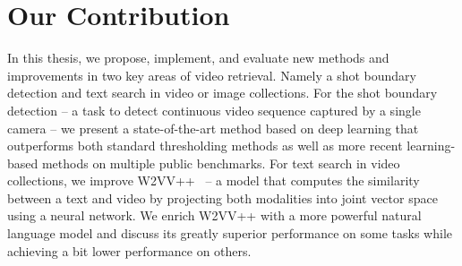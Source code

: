 


\section*{Our Contribution}
In this thesis, we propose, implement, and evaluate new methods and improvements in two key areas of video retrieval. Namely a shot boundary detection and text search in video or image collections. For the shot boundary detection -- a task to detect continuous video sequence captured by a single camera -- we present a state-of-the-art method based on deep learning that outperforms both standard thresholding methods as well as more recent learning-based methods on multiple public benchmarks. For text search in video collections, we improve W2VV++~\cite{XirongW2VVpp} -- a model that computes the similarity between a text and video by projecting both modalities into joint vector space using a neural network. We enrich W2VV++ with a more powerful natural language model and discuss its greatly superior performance on some tasks while achieving a bit lower performance on others.

